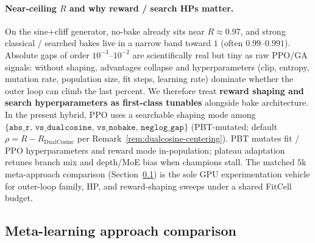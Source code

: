 \paragraph{Near-ceiling $R$ and why reward / search HPs matter.}
\label{sec:reward-shaping}
On the sine{+}cliff generator, no-bake already sits near $R\approx 0.97$, and strong classical / searched bakes live in a narrow band toward $1$ (often $0.99$--$0.991$).
Absolute gaps of order $10^{-3}$--$10^{-2}$ are scientifically real but tiny as raw PPO/GA signals: without shaping, advantages collapse and hyperparameters (clip, entropy, mutation rate, population size, fit steps, learning rate) dominate whether the outer loop can climb the last percent.
We therefore treat \textbf{reward shaping and search hyperparameters as first-class tunables} alongside bake architecture.
In the present hybrid, PPO uses a searchable shaping mode among $\{\texttt{abs\_r},\,\texttt{vs\_dualcosine},\,\texttt{vs\_nobake},\,\texttt{neglog\_gap}\}$ (PBT-mutated; default $\rho = R - R_{\mathrm{DualCosine}}$ per Remark~\ref{rem:dualcosine-centering}).
PBT mutates fit / PPO hyperparameters and reward mode in-population; plateau adaptation retunes branch mix and depth/MoE bias when champions stall.
The matched $5$k meta-approach comparison (Section~\ref{sec:meta-compare}) is the sole GPU experimentation vehicle for outer-loop family, HP, and reward-shaping sweeps under a shared FitCell budget.

\subsection{Meta-learning approach comparison}
\label{sec:meta-compare}

